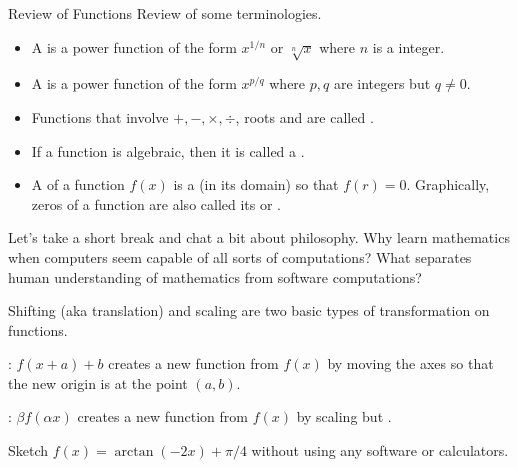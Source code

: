 \documentclass[../main.tex]{subfiles}
\begin{document}
\begin{lesson}{Review of Functions}
  Review of some terminologies. 
  \begin{itemize}[noitemsep]
    \item A  is a power function of the form \(x^{1/n}\) or \(\sqrt[n]{x}\) where \(n\) is a  integer. 

    \item A  is a power function of the form \(x^{p/q}\) where \(p,q\) are integers but \(q \ne 0\).

    \item Functions that involve \(+, -, \times, \div\), roots and  are called . 

    \item If a function is  algebraic, then it is called a .

    \item A  of a function \(f(x)\) is a  (in its domain) so that \(f(r) = 0\).  Graphically, zeros of a function are also called its  or \hlmain{\underline{\hspace{1in}}}.
  \end{itemize}

  Let's take a short break and chat a bit about philosophy. \faComments{} Why learn mathematics when computers seem capable of all sorts of computations? \faComments{} What separates human understanding of mathematics from software computations?
  \clearpage

  Shifting (aka translation) and scaling are two basic types of transformation on functions.

  : \(f(x + a) + b\) creates a new function from \(f(x)\) by moving the axes so that the new origin is at the point \((a,b)\).

  : \(\beta f(\alpha x)\) creates a new function from \(f(x)\) by scaling  but .

  \clearpage
  \begin{example}
    Sketch \(f(x) = \arctan(-2x) + \pi/4\) without using any software or calculators.


\end{example}
\end{lesson}
\end{document}
